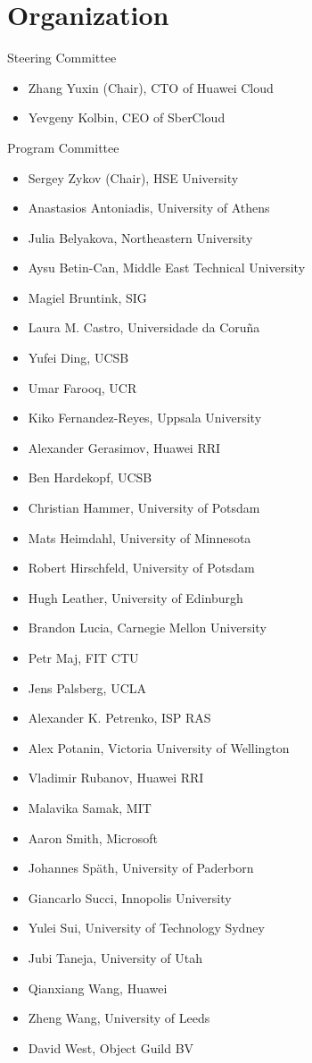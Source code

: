 \newpage
\section*{Organization}

\begin{multicols}{2}
\raggedright
Steering Committee

\begin{itemize}
\item Zhang Yuxin (Chair), CTO of Huawei Cloud
\item Yevgeny Kolbin, CEO of SberCloud
\end{itemize}

Program Committee

\begin{itemize}
\item Sergey Zykov (Chair), HSE University
\item Anastasios Antoniadis, University of Athens
\item Julia Belyakova, Northeastern University
\item Aysu Betin-Can, Middle East Technical University
\item Magiel Bruntink, SIG
\item Laura M. Castro, Universidade da Coruña
\item Yufei Ding, UCSB
\item Umar Farooq, UCR
\item Kiko Fernandez-Reyes, Uppsala University
\item Alexander Gerasimov, Huawei RRI
\item Ben Hardekopf, UCSB
\item Christian Hammer, University of Potsdam
\item Mats Heimdahl, University of Minnesota
\item Robert Hirschfeld, University of Potsdam
\item Hugh Leather, University of Edinburgh
\item Brandon Lucia, Carnegie Mellon University
\item Petr Maj, FIT CTU
\item Jens Palsberg, UCLA
\item Alexander K. Petrenko, ISP RAS
\item Alex Potanin, Victoria University of Wellington
\item Vladimir Rubanov, Huawei RRI
\item Malavika Samak, MIT
\item Aaron Smith, Microsoft
\item Johannes Späth, University of Paderborn
\item Giancarlo Succi, Innopolis University
\item Yulei Sui, University of Technology Sydney
\item Jubi Taneja, University of Utah
\item Qianxiang Wang, Huawei
\item Zheng Wang, University of Leeds
\item David West, Object Guild BV
\end{itemize}


\end{multicols}
